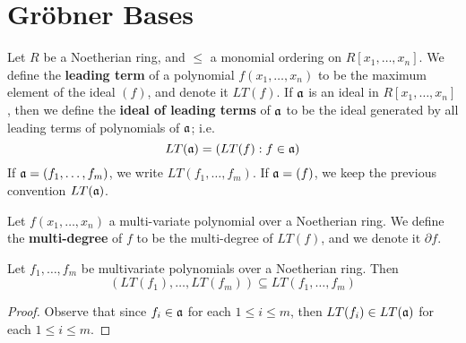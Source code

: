 \section{Gr\"obner Bases}
\label{section_7.6}

\begin{definition}
  Let $R$ be a Noetherian ring, and $\leq$ a monomial ordering on
  $R[x_1, \dots, x_n]$. We define the \textbf{leading term} of a
  polynomial $f(x_1, \dots, x_n)$ to be the maximum element of the
  ideal $(f)$, and denote it $LT(f)$. If $\mathfrak{a}$ is an ideal in $R[x_1,
  \dots, x_n]$, then we define the \textbf{ideal of leading terms} of
  $\mathfrak{a}$ to be the ideal generated by all leading terms of polynomials
  of $\mathfrak{a}$; i.e.
  \begin{equation*}
    LT(\mathfrak{a})=(LT(f) : f \in \mathfrak{a})
  \end{equation*}
  If $\mathfrak{a}=(f_1, \dots, f_m)$, we write $LT(f_1, \dots, f_m)$. If
  $\mathfrak{a}=(f)$, we keep the previous convention $LT(\mathfrak{a})$.
\end{definition}

\begin{definition}
  Let $f(x_1, \dots, x_n)$ a multi-variate polynomial over a
  Noetherian ring. We define the \textbf{multi-degree} of $f$ to be
  the multi-degree of $LT(f)$, and we denote it $\partial{f}$.
\end{definition}

\begin{lemma}\label{lemma_7.6.1}
  Let $f_1, \dots, f_m$ be multivariate polynomials over a Noetherian
  ring. Then
  \begin{equation*}
    (LT(f_1), \dots, LT(f_m)) \subseteq LT(f_1, \dots, f_m)
  \end{equation*}
\end{lemma}
\begin{proof}
  Observe that since $f_i \in \mathfrak{a}$ for each $1 \leq i \leq m$, then
  $LT(f_i) \in LT(\mathfrak{a})$ for each $1 \leq i \leq m$.
\end{proof}

